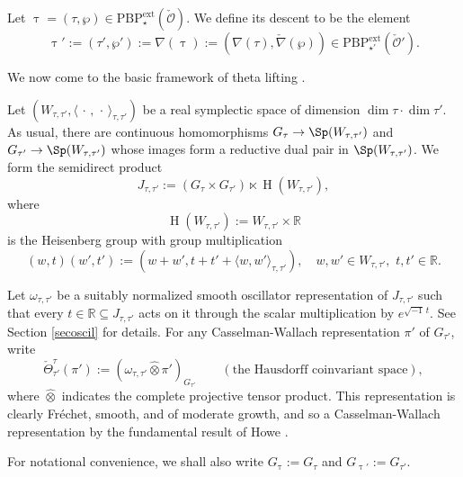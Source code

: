 \documentclass[11pt,a4paper]{amsart}
\newcommand{\CO}{{\mathcal {O}}}
\newcommand{\oH}{\operatorname{H}}
\newcommand{\R}{\mathbb R}
\def\DD{\nabla}
\newcommand{\la}{\langle}
\newcommand{\ra}{\rangle}
\numberwithin{equation}{section}
\theoremstyle{remark}
\def\subset{\subseteq}
\def\PBPes{\mathrm{PBP}^{\mathrm{ext}}_{\star}}
\def\ckDD{{\check\DD}}
\def\PBP{\mathrm{PBP}}
\begin{document}
Let  $\uptau = (\tau,\wp)\in \mathrm{\PBPes}(\check \CO)$.  We define its  descent to be the element
 \[
  \uptau' := (\tau',\wp'):=\nabla(\uptau):= (\DD(\tau), \ckDD(\wp))\in \mathrm{\PBP}^{\mathrm{ext}}_{\star'}(\check \CO').
 \]


We now come to the basic framework of theta lifting \cite{Howe79, Howe89}.

Let $(W_{\tau, \tau'}, \la \,\cdot\,,\,\cdot\,\ra_{\tau, \tau'})$ be a real symplectic space of  dimension $\dim \tau\cdot \dim \tau'$. As usual, there are continuous homomorphisms $G_\tau\rightarrow \Sp(W_{\tau, \tau'})$ and $G_{\tau'}\rightarrow \Sp(W_{\tau, \tau'})$ whose images form a reductive dual pair in $\Sp(W_{\tau, \tau'})$. We form the semidirect product
   \[
   J_{\tau, \tau'}:=(G_\tau\times G_{\tau'})\ltimes \oH(W_{\tau, \tau'}),
   \]
   where
  \[
  \oH(W_{\tau, \tau'}):=W_{\tau, \tau'}\times \R
  \]
  is the Heisenberg group with group multiplication
  \[
  (w,t)(w',t'):=(w+w', t+t'+\la w,w'\ra_{\tau, \tau'}), \quad
  w,w'\in W_{\tau, \tau'},\,\,t,t'\in \R.
 \]

 Let $\omega_{\tau, \tau'}$ be a suitably normalized smooth oscillator representation of $J_{\tau, \tau'}$ such that every $t\in \R\subset J_{\tau, \tau'}$ acts on it through the scalar multiplication by $e^{\sqrt{-1}\, t}$. See Section \ref{secoscil} for details.
  For any Casselman-Wallach representation $\pi'$ of $G_{\tau'}$, write
 \[
   \check \Theta_{\tau'}^{\tau}(\pi'):=(\omega_{\tau, \tau'}\widehat \otimes \pi')_{G_{\tau'}} \qquad (\textrm{the Hausdorff coinvariant space}),
 \]
 where $\widehat \otimes$ indicates the complete projective tensor product. This representation is clearly Fr\'echet, smooth, and of moderate growth, and so a Casselman-Wallach representation by the fundamental result of Howe \cite{Howe89}.

For notational convenience, we shall also write $G_{\uptau}:=G_{\tau}$ and $G_{\uptau'}:=G_{\tau'}$.
\end{document}

